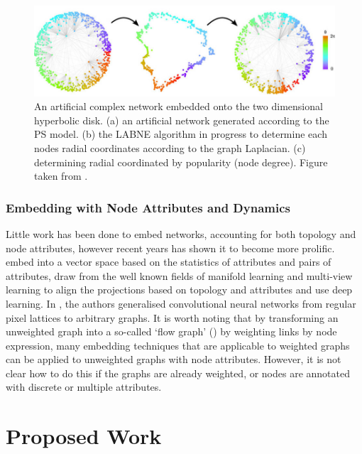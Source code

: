 \documentclass[
11pt, %
english, %
singlespacing, %
headsepline, %
]{MastersDoctoralThesis} %
\begin{document}
\begin{figure}
	\centering
	\includegraphics[width=\textwidth]{figures/LABNE}
	\caption[A hyperbolic network embedding algorithm in action]{An artificial complex network embedded onto the two dimensional hyperbolic disk. (a) an artificial network generated according to the PS model. (b) the LABNE algorithm in progress to determine each nodes radial coordinates according to the graph Laplacian. (c) determining radial coordinated by popularity (node degree). Figure taken from \cite{alanis2016efficient}.}
\end{figure}

\subsection{Embedding with Node Attributes and Dynamics}
Little work has been done to embed networks, accounting for both topology and node attributes, however recent years has shown it to become more prolific. \cite{gibert2012graph} embed into a vector space based on the statistics of attributes and pairs of attributes, \cite{li2017attributed} draw from the well known fields of manifold learning and multi-view learning to align the projections based on topology and attributes and \cite{liao2017attributed} use deep learning. In \cite{niepert2016learning}, the authors generalised convolutional neural networks from regular pixel lattices to arbitrary graphs. It is worth noting that by transforming an unweighted graph into a so-called `flow graph' (\cite{ISI:000293452500017}) by weighting links by node expression, many embedding techniques that are applicable to weighted graphs can be applied to unweighted graphs with node attributes. However, it is not clear how to do this if the graphs are already weighted, or nodes are annotated with discrete or multiple attributes.




\chapter{Proposed Work}
\end{document}
